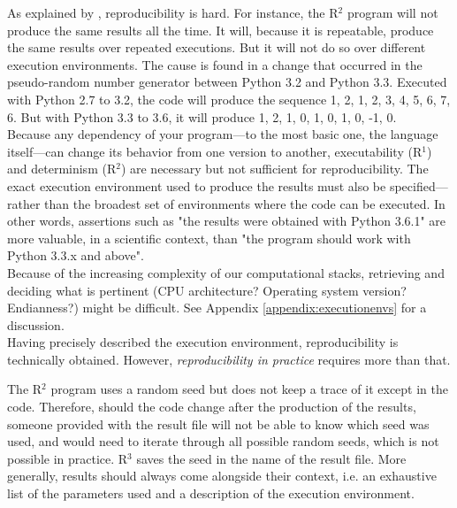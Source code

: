 \documentclass[a4paper,11pt]{article}
\begin{document}
As explained by \citeauthor{Mesnard:2016} \citep{Mesnard:2016}, reproducibility is hard. 
For instance, the R$^2$ program will not produce the same results all the time. It will, because it is repeatable, produce the same results over repeated executions.
But it will not do so over different execution environments. The cause is found in a change that occurred in the pseudo-random number generator between Python 3.2 and Python 3.3. 
Executed with Python 2.7 to 3.2, the code will produce the sequence 1, 2, 1, 2, 3, 4, 5, 6, 7, 6. But with Python 3.3 to 3.6, it will produce 1, 2, 1, 0, 1, 0, 1, 0, -1, 0.\\

Because any dependency of your program---to the most basic one, the language itself---can change its behavior from one version to another, executability (R$^1$) and determinism (R$^2$) are necessary but not sufficient for reproducibility. The exact execution environment used to produce the results must also be specified---rather than the broadest set of environments where the code can be executed. In other words, assertions such as "the results were obtained with Python 3.6.1" are more valuable, in a scientific context, than "the program should work with Python 3.3.x and above".\\

Because of the increasing complexity of our computational stacks, retrieving and deciding what is pertinent (CPU architecture? Operating system version? Endianness?) might be difficult.
See Appendix \ref{appendix:executionenvs} for a discussion.\\

Having precisely described the execution environment, reproducibility is technically obtained. However, \emph{reproducibility in practice} requires more than that.

The R$^2$ program uses a random seed but does not keep a trace of it except in the code. Therefore, should the code change after the production of the results, someone provided with the result file will not be able to know which seed was used, and would need to iterate through all possible random seeds, which is not possible in practice. R$^3$ saves the seed in the name of the result file. More generally, results should always come alongside their context, i.e. an exhaustive list of the parameters used and a description of the execution environment.\\
\end{document}
